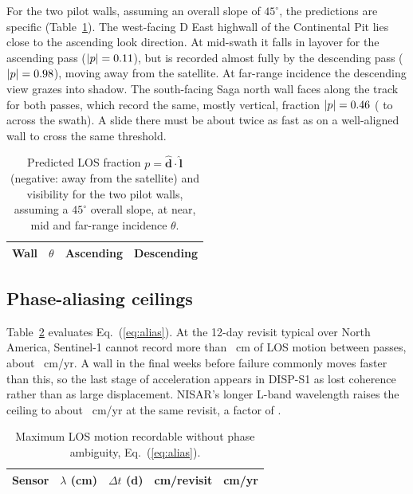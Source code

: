 \documentclass[aps,prd,twocolumn,superscriptaddress,nofootinbib,floatfix,preprintnumbers,10pt]{revtex4-2}
\newcommand{\vhat}[1]{\hat{\bm{#1}}}
\begin{document}
For the two pilot walls, assuming an overall slope of $45^\circ$, the predictions are specific (Table~\ref{tab:pilotwalls}). The west-facing D East highwall of the Continental Pit lies close to the ascending look direction. At mid-swath it falls in layover for the ascending pass ($|p|=0.11$), but is recorded almost fully by the descending pass ($|p|=0.98$), moving away from the satellite. At far-range incidence the descending view grazes into shadow. The south-facing Saga north wall faces along the track for both passes, which record the same, mostly vertical, fraction $|p|=0.46$ (\SagaFar{} to \SagaNear{} across the swath). A slide there must be about twice as fast as on a well-aligned wall to cross the same threshold.

\begin{table}[t]
\caption{Predicted LOS fraction $p=\vhat{d}\cdot\vhat{l}$ (negative: away from the satellite) and visibility for the two pilot walls, assuming a $45^\circ$ overall slope, at near, mid and far-range incidence $\theta$.}
\label{tab:pilotwalls}
\begin{ruledtabular}
\begin{tabular}{p{2.3cm}ccc}
Wall & $\theta$ & Ascending & Descending \\
\hline

\end{tabular}
\end{ruledtabular}
\end{table}

\subsection{Phase-aliasing ceilings}\label{sec:alias}

Table~\ref{tab:alias} evaluates Eq.~(\ref{eq:alias}). At the 12-day revisit typical over North America, Sentinel-1 cannot record more than \QuarterC{}~cm of LOS motion between passes, about \AliasTwelve{}~cm/yr. A wall in the final weeks before failure commonly moves faster than this, so the last stage of acceleration appears in DISP-S1 as lost coherence rather than as large displacement. NISAR's longer L-band wavelength raises the ceiling to about \AliasNisar{}~cm/yr at the same revisit, a factor of \AliasRatio.

\begin{table}[t]
\caption{Maximum LOS motion recordable without phase ambiguity, Eq.~(\ref{eq:alias}).}
\label{tab:alias}
\begin{ruledtabular}
\begin{tabular}{lcccc}
Sensor & $\lambda$ (cm) & $\Delta t$ (d) & cm/revisit & cm/yr \\
\hline

\end{tabular}
\end{ruledtabular}
\end{table}
\end{document}

